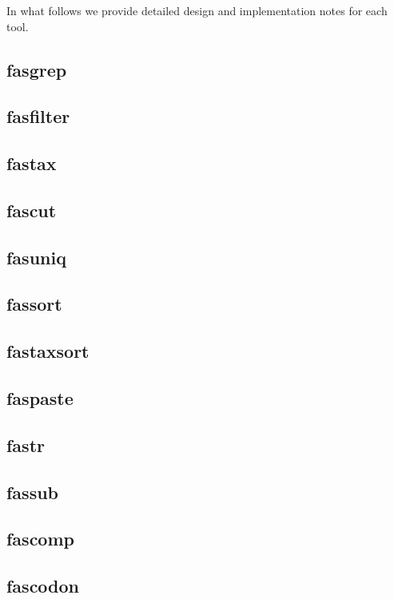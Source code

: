 \documentclass{frontiersSCNS} %
\begin{document}
In what follows we provide detailed design and implementation notes
for each tool.

\subsection{fasgrep}

\subsection{fasfilter}
 
\subsection{fastax}

\subsection{fascut}

\subsection{fasuniq}

\subsection{fassort}
    
\subsection{fastaxsort} 
    
\subsection{faspaste}

\subsection{fastr} 

\subsection{fassub}

\subsection{fascomp}

\subsection{fascodon}
\end{document}
